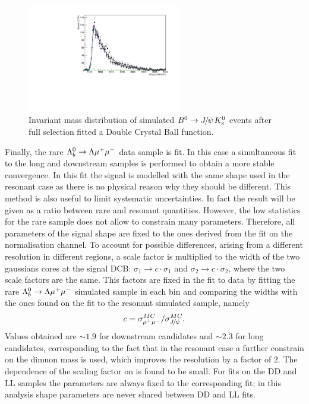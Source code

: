 \begin{figure}
\centering
\includegraphics[width=0.6\textwidth]{Lmumu/figs/MassFits/fitKS_bkg.pdf}
\caption{Invariant mass distribution of simulated $\Bz\ra\jpsi\KS$ events after 
full selection fitted a Double Crystal Ball function. }
\label{fig:KSbkgFit}
\end{figure}

Finally, the rare $\Lambda^0_b\rightarrow\Lambda\mu^+\mu^-$ data sample is fit. In this case a simultaneous fit to the long
and downstream samples is performed to obtain a more stable convergence. 
In this fit the signal is modelled with the same shape used in the resonant case as there is no physical
reason why they should be different. This method is also useful to limit systematic uncertainties.
In fact the result will be given as a ratio between rare and resonant quantities.
However, the low statistics for the rare sample does not allow to constrain many parameters.
Therefore, all parameters of the signal shape are fixed to
the ones derived from the fit on the normalisation channel. To account for possible differences, arising
from a different resolution in different \qsq regions, a scale factor is multiplied
to the width of the two gaussians cores at the signal DCB: $\sigma_1 \rightarrow c\cdot \sigma_1$
and $\sigma_2 \rightarrow c\cdot \sigma_2$, where the two scale factors are the same. This factors
are fixed in the fit to data by fitting the rare $\Lambda^0_b\rightarrow\Lambda\mu^+\mu^-$ simulated sample in each \qsq bin and comparing
the widths with the ones found on the fit to the resonant simulated sample, namely
\begin{equation}
c = \sigma_{\mumu}^{MC} / \sigma_{\jpsi}^{MC}.
\end{equation}
Values obtained are $\sim 1.9$ for downstream candidates and $\sim 2.3$ for long candidates,
corresponding to the fact that in the resonant case a further constrain on the dimuon mass
is used, which improves the resolution by a factor of 2. The dependence of the scaling factor on \qsq 
is found to be small. For fits on the DD and LL samples the parameters are always fixed to the corresponding 
\jpsi fit; in this analysis shape parameters are never shared between DD and LL fits.

